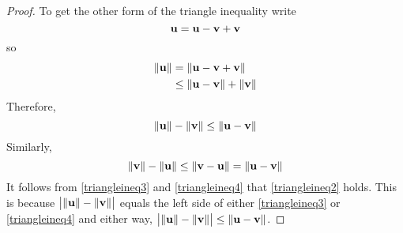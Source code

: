 \begin{proof}
To get the other form of the triangle inequality write 
\begin{equation*}
{\bf u}={\bf u}-{\bf v}+{\bf v}
\end{equation*}
so
\begin{align*}
\| {\bf u}\| & =\| {\bf u}-{\bf v}+{\bf v}\| \\
& \leq \| {\bf u}-{\bf v}\| +\| {\bf v}\| 
\end{align*}
Therefore,
\begin{equation}
\| {\bf u}\| -\| {\bf v}\| \leq \| {\bf u}-{\bf v}
\|  \label{triangleineq3}
\end{equation}
Similarly,
\begin{equation}
\| {\bf v}\| -\| {\bf u}\| \leq \| {\bf v}-{\bf u}
\| =\| {\bf u}-{\bf v}\|  \label{triangleineq4}
\end{equation}
It follows from \ref{triangleineq3} and \ref{triangleineq4} that \ref{triangleineq2} holds. This
is because $\big| \| {\bf u}\| -\| {\bf v}\|
\big| $ equals the left side of either \ref{triangleineq3} or \ref{triangleineq4} and
either way, $\big| \| {\bf u}\| -\| {\bf v}\|
\big| \leq \| {\bf u}-{\bf v}\| $. 
\end{proof}